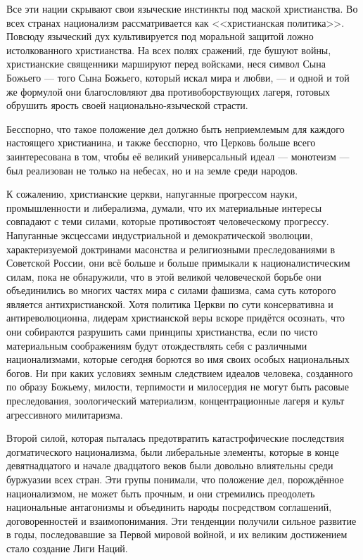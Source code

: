 \sloppy Все эти нации скрывают свои языческие инстинкты под маской христианства. Во всех странах национализм рассматривается как <<христианская политика>>. Повсюду языческий дух культивируется под моральной защитой ложно истолкованного христианства. На всех полях сражений, где бушуют войны, христианские священники маршируют перед войсками, неся символ Сына Божьего — того Сына Божьего, который искал мира и любви, — и одной и той же формулой они благословляют два противоборствующих лагеря, готовых обрушить ярость своей национально-языческой страсти.

Бесспорно, что такое положение дел должно быть неприемлемым для каждого настоящего христианина, и также бесспорно, что Церковь больше всего заинтересована в том, чтобы её великий универсальный идеал — монотеизм — был реализован не только на небесах, но и на земле среди народов.

К сожалению, христианские церкви, напуганные прогрессом науки, промышленности и либерализма, думали, что их материальные интересы совпадают с теми силами, которые противостоят человеческому прогрессу. Напуганные эксцессами индустриальной и демократической эволюции, характеризуемой доктринами масонства и религиозными преследованиями в Советской России, они всё больше и больше примыкали к националистическим силам, пока не обнаружили, что в этой великой человеческой борьбе они объединились во многих частях мира с силами фашизма, сама суть которого является антихристианской. Хотя политика Церкви по сути консервативна и антиреволюционна, лидерам христианской веры вскоре придётся осознать, что они собираются разрушить сами принципы христианства, если по чисто материальным соображениям будут отождествлять себя с различными национализмами, которые сегодня борются во имя своих особых национальных богов. Ни при каких условиях земным следствием идеалов человека, созданного по образу Божьему, милости, терпимости и милосердия не могут быть расовые преследования, зоологический материализм, концентрационные лагеря и культ агрессивного милитаризма.

Второй силой, которая пыталась предотвратить катастрофические последствия догматического национализма, были либеральные элементы, которые в конце девятнадцатого и начале двадцатого веков были довольно влиятельны среди буржуазии всех стран. Эти групы понимали, что положение дел, порождённое национализмом, не может быть прочным, и они стремились преодолеть национальные антагонизмы и объединить народы посредством соглашений, договоренностей и взаимопонимания. Эти тенденции получили сильное развитие в годы, последовавшие за Первой мировой войной, и их великим достижением стало создание Лиги Наций.

